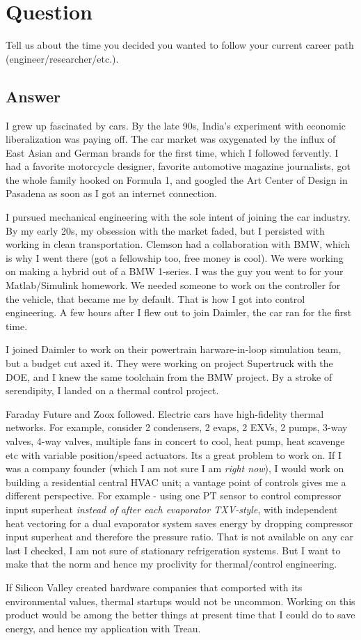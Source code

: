 \section{Question}
Tell us about the time you decided you wanted to follow your current career path
(engineer/researcher/etc.).

\subsection *{Answer}
I grew up fascinated by cars. By the late 90s, India's experiment with economic liberalization was paying off. The car market was oxygenated by the influx of East Asian and German brands for the first time, which I followed fervently. I had a favorite motorcycle designer, favorite automotive magazine journalists, got the whole family hooked on Formula 1, and googled the Art Center of Design in Pasadena as soon as I got an internet connection.

I pursued mechanical engineering with the sole intent of joining the car industry. By my early 20s, my obsession with the market faded, but I persisted with working in clean transportation. Clemson had a collaboration with BMW, which is why I went there (got a fellowship too, free money is cool). We were working on making a hybrid out of a BMW 1-series. I was the guy you went to for your Matlab/Simulink homework. We needed someone to work on the controller for the vehicle, that became me by default. That is how I got into control engineering. A few hours after I flew out to join Daimler, the car ran for the first time.

I joined Daimler to work on their powertrain harware-in-loop simulation team, but a budget cut axed it. They were working on project Supertruck with the DOE, and I knew the same toolchain from the BMW project. By a stroke of serendipity, I landed on a thermal control project.

Faraday Future and Zoox followed. Electric cars have high-fidelity thermal networks. For example, consider 2 condensers, 2 evaps, 2 EXVs, 2 pumps, 3-way valves, 4-way valves, multiple fans in concert to cool, heat pump, heat scavenge etc with variable position/speed actuators. Its a great problem to work on. If I was a company founder (which I am not sure I am \textit{right now}), I would work on building a residential central HVAC unit; a vantage point of controls gives me a different perspective. For example - using one PT sensor to control compressor input superheat \textit{instead of after each evaporator TXV-style}, with independent heat vectoring for a dual evaporator system saves energy by dropping compressor input superheat and therefore the pressure ratio. That is not available on any car last I checked, I am not sure of stationary refrigeration systems. But I want to make that the norm and hence my proclivity for thermal/control engineering.

If Silicon Valley created hardware companies that comported with its environmental values, thermal startups would not be uncommon. Working on this product would be among the better things at present time that I could do to save energy, and hence my application with Treau.